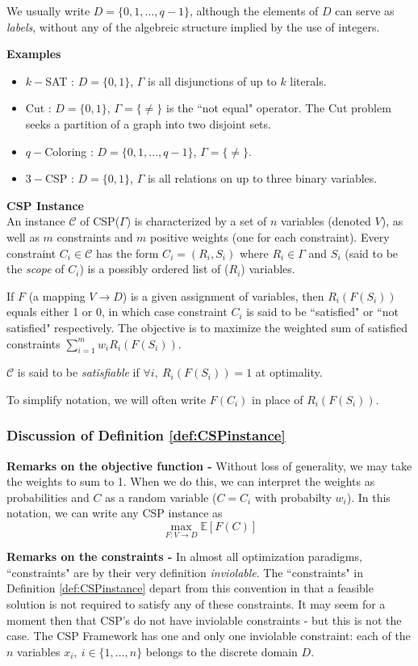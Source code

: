 \documentclass[12pt]{article}
\begin{document}
We usually write $D = \{0,1,\ldots,q-1\}$, although the elements of $D$ can serve as \textit{labels}, without any of the algebreic structure implied by the use of integers.

\textbf{Examples}
\begin{itemize}
\item $k-$SAT : $D = \{0,1\}$, $\Gamma$ is all disjunctions of up to $k$ literals.
\item Cut : $D = \{0,1\}$, $\Gamma = \{\neq\}$ is the ``not equal" operator. The Cut problem seeks a partition of a graph into two disjoint sets.
\item $q-$Coloring : $D = \{0,1,\ldots,q-1\}$, $\Gamma = \{\neq\}$.
\item $3-$CSP : $D = \{0,1\}$, $\Gamma$ is all relations on up to three binary variables.
\end{itemize}

\begin{definition}
\textbf{CSP Instance}\\
An instance $\mathcal{C}$ of CSP($\Gamma$) is characterized by a set of $n$ variables (denoted $V$), as well as $m$ constraints and $m$ positive weights (one for each constraint). 
Every constraint $C_i \in \mathcal{C}$ has the form $C_i = (R_i,S_i)$ where $R_i \in \Gamma$ and $S_i$ (said to be the \textit{scope} of $C_i$) is a possibly ordered list of ($R_i$) variables. 

If $F$ (a mapping $ V\to D$) is a given assignment of variables, then $R_i(F(S_i))$ equals either 1 or 0, in which case constraint $C_i$ is said to be ``satisfied" or ``not satisfied" respectively.
The objective is to maximize the weighted sum of satisfied constraints $\sum_{i = 1}^m w_i R_i(F(S_i))$. 

$\mathcal{C}$ is said to be \textit{satisfiable} if $\forall i, ~ R_i(F(S_i)) = 1$ at optimality.
\label{def:CSPinstance}
\end{definition}
To simplify notation, we will often write $F(C_i)$ in place of $R_i(F(S_i))$.

\subsubsection{Discussion of Definition \ref{def:CSPinstance}}
\textbf{Remarks on the objective function - }Without loss of generality, we may take the weights to sum to 1. 
When we do this, we can interpret the weights as probabilities and $C$ as a random variable ($C = C_i$ with probabilty $w_i$). In this notation, we can write any CSP instance as
\begin{equation}
\max_{F: V \to D} \mathbb{E}\left[F(C)\right]
\end{equation}

\textbf{Remarks on the constraints - }In almost all optimization paradigms, ``constraints" are by their very definition \textit{inviolable}. The ``constraints" in Definition \ref{def:CSPinstance} depart from this convention in that a feasible solution is not required to satisfy any of these constraints. It may seem for a moment then that CSP's do not have inviolable constraints - but this is not the case. The CSP Framework has one and only one inviolable constraint: each of the $n$ variables $x_i, ~ i \in\{1,\ldots,n\}$ belongs to the discrete domain $D$. 
\end{document}

